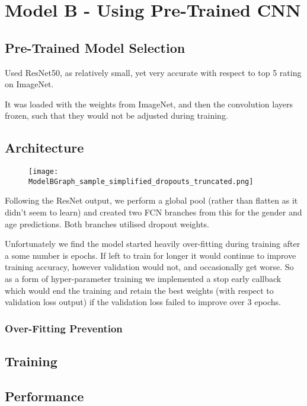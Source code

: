 
\section{Model B - Using Pre-Trained CNN}
\subsection{Pre-Trained Model Selection}
Used ResNet50, as relatively small, yet very accurate with respect to top 5 rating on ImageNet.

It was loaded with the weights from ImageNet, and then the convolution layers frozen, such that they would not be adjusted during training.

\subsection{Architecture}
\begin{figure}[h]
    \centering
    \texttt{[image: ModelBGraph\_sample\_simplified\_dropouts\_truncated.png]}
\end{figure}
Following the ResNet output, we perform a global pool (rather than flatten as it didn't seem to learn) and created two FCN branches from this for the gender and age predictions.
Both branches utilised dropout weights.

Unfortunately we find the model started heavily over-fitting during training after a some number is epochs.
If left to train for longer it would continue to improve training accuracy, however validation would not, and occasionally get worse.
So as a form of hyper-parameter training we implemented a stop early callback which would end the training and retain the best weights (with respect to validation loss output) if the validation loss failed to improve over 3 epochs.

\subsubsection{Over-Fitting Prevention}


\subsection{Training}


\subsection{Performance}

